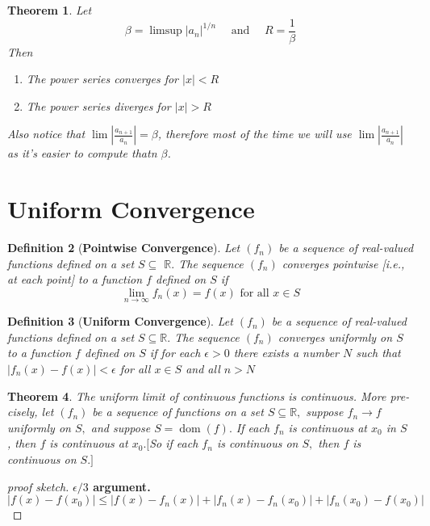 \documentclass[12pt]{article}
\newtheorem{theorem}{Theorem}[section]
\newtheorem{definition}[theorem]{Definition}
\begin{document}
\begin{theorem}
	Let $$
	\beta = \limsup \left| a _ { n } \right| ^ { 1 / n } \quad \text { and } \quad R = \frac { 1 } { \beta }
	$$
	Then
	\begin{enumerate}
		\item The power series converges for  $|x| < R$
		\item The power series diverges for $|x| > R$
	\end{enumerate}
	
	Also notice that $\lim \left| \frac { a _ { n + 1 } } { a _ { n } } \right| = \beta$, therefore most of the time we will use $\lim \left| \frac { a _ { n + 1 } } { a _ { n } } \right|$ as it's easier to compute thatn $\beta$.
\end{theorem}
\section{Uniform Convergence}
\begin{definition}[\textbf{Pointwise Convergence}]
	Let $\left( f _ { n } \right)$ be a sequence of real-valued functions defined on a set $S \subseteq$
	$\mathbb { R } .$ The sequence $\left( f _ { n } \right)$ converges pointwise [i.e., at each point] to a
	function $f$ defined on $S$ if $$
	\lim _ { n \rightarrow \infty } f _ { n } ( x ) = f ( x ) \text { for all } x \in S
	$$
\end{definition}

\begin{definition}[\textbf{Uniform Convergence}]
	Let $\left( f _ { n } \right)$ be a sequence of real-valued functions defined on a set
	$S \subseteq \mathbb { R } .$ The sequence $\left( f _ { n } \right)$ converges uniformly on $S$ to a function $f$
	defined on $S$ if for each $\epsilon > 0$ there exists a number $N$ such that
	$\left| f _ { n } ( x ) - f ( x ) \right| < \epsilon$ for all $x \in S$ and all $n > N$
\end{definition}

\begin{theorem}
	The uniform limit of continuous functions is continuous. More pre-
	cisely, let $\left( f _ { n } \right)$ be a sequence of functions on a set $S \subseteq \mathbb { R } ,$ suppose $f _ { n } \rightarrow f$ uniformly on $S ,$ and suppose $S = \operatorname { dom } ( f ) .$ If each $f _ { n }$ is
	continuous at $x _ { 0 }$ in $S$ , then $f$ is continuous at $x _ { 0 } . [$So if each $f _ { n }$ is continuous on $S ,$ then $f$ is continuous on $S . ]$
\end{theorem}
\begin{proof}[proof sketch]
	\textbf{$\epsilon/3$ argument.}\\
	$$
	\left| f ( x ) - f \left( x _ { 0 } \right) \right| \leq \left| f ( x ) - f _ { n } ( x ) \right| + \left| f _ { n } ( x ) - f _ { n } \left( x _ { 0 } \right) \right| + \left| f _ { n } \left( x _ { 0 } \right) - f \left( x _ { 0 } \right) \right|
	$$
\end{proof}
\end{document}
